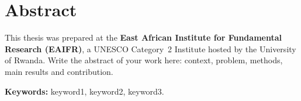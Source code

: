 \chapter*{Abstract}

This thesis was prepared at the \textbf{East African Institute for Fundamental Research (EAIFR)},
a UNESCO Category~2 Institute hosted by the University of Rwanda.
Write the abstract of your work here: context, problem, methods, main results and contribution.

\bigskip
\noindent\textbf{Keywords:} keyword1, keyword2, keyword3.
